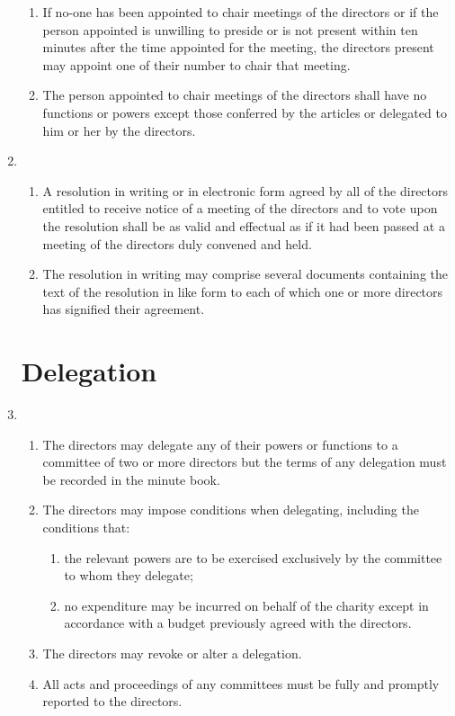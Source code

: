 \begin{enumerate}
\begin{enumerate}
  \item
    If no-one has been appointed to chair meetings of the directors or
    if the person appointed is unwilling to preside or is not present
    within ten minutes after the time appointed for the meeting, the
    directors present may appoint one of their number to chair that
    meeting.
  \item
    The person appointed to chair meetings of the directors shall have
    no functions or powers except those conferred by the articles or
    delegated to him or her by the directors.
  \end{enumerate}
\item
  \begin{enumerate}
  \item
    A resolution in writing or in electronic form agreed by all of the
    directors entitled to receive notice of a meeting of the directors
    and to vote upon the resolution shall be as valid and effectual as
    if it had been passed at a meeting of the directors duly convened
    and held.
  \item
    The resolution in writing may comprise several documents containing
    the text of the resolution in like form to each of which one or
    more directors has signified their agreement.
  \end{enumerate}

\section{Delegation}

\item
  \begin{enumerate}
  \item
    The directors may delegate any of their powers or functions to a
    committee of two or more directors but the terms of any delegation
    must be recorded in the minute book.
  \item
    The directors may impose conditions when delegating, including the
    conditions that:
    \begin{enumerate}
    \item
      the relevant powers are to be exercised exclusively by the
      committee to whom they delegate;
    \item
      no expenditure may be incurred on behalf of the charity except in
      accordance with a budget previously agreed with the directors.
    \end{enumerate}
  \item
    The directors may revoke or alter a delegation.
  \item
    All acts and proceedings of any committees must be fully and
    promptly reported to the directors.
  \end{enumerate}


\end{enumerate}
